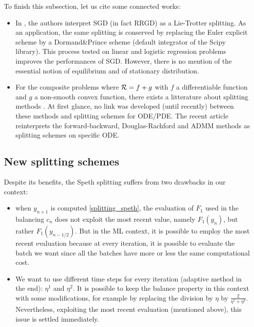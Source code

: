 \begin{remark}
	To finish this subsection, let us cite some connected works:
	\begin{itemize}
		\item In \cite{splitting_sgd}, the authors interpret SGD (in fact RRGD) as a Lie-Trotter splitting. As an application, the same splitting is conserved by replacing the Euler explicit scheme by a Dormand\&Prince scheme (default integrator of the Scipy library). This process tested on linear and logistic regression problems improves the performances of SGD. However, there is no mention of the essential notion of equilibrium and of stationary distribution. 
		\item For the composite problems where $\mathcal{R}=f+g$ with $f$ a differentiable function and $g$ a non-smooth convex function, there exists a litterature about splitting methods \cite{splitting_proximal}. At first glance, no link was developed (until recently) between these methods and splitting schemes for ODE/PDE. The recent article \cite{splitting_proximal_ode} reinterprets the forward-backward, Douglas-Rachford and ADMM methods as splitting schemes on specific ODE.   
	\end{itemize}
\end{remark}

\subsection{New splitting schemes}
\label{new_splitting}

Despite its benefits, the Speth splitting suffers from two drawbacks in our context:
\begin{itemize}
	\item when $y_{n+1}$ is computed \eqref{splitting_speth}, the evaluation of $F_1$ used in the balancing $c_n$ does not exploit the most recent value, namely $F_1(y_n)$, but rather $F_1(y_{n-1/2})$. But in the ML context, it is possible to employ the most recent evaluation because at every iteration, it is possible to evaluate the batch we want since all the batches have more or less the same computational cost. 
	\item We want to use different time steps for every iteration (adaptive method in the end): $\eta^1$ and $\eta^2$. It is possible to keep the balance property in this context with some modifications, for example by replacing the division by $\eta$ by $\frac{2}{\eta^1+\eta^2}$. Nevertheless, exploiting the most recent evaluation (mentioned above), this issue is settled immediately. 
\end{itemize}

